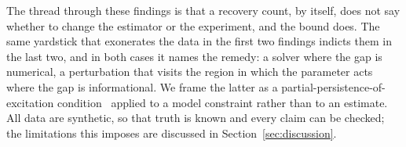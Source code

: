 The thread through these findings is that a recovery count, by itself, does not
say whether to change the estimator or the experiment, and the bound does. The
same yardstick that exonerates the data in the first two findings
indicts them in the last two, and in both cases it names the remedy: a solver
where the gap is numerical, a perturbation that visits the region in which the
parameter acts where the gap is informational. We frame the latter as a
partial-persistence-of-excitation
condition~\citep{wang2006learning,sastry1989adaptive} applied to a model
constraint rather than to an estimate. All data are synthetic, so that truth
is known and every claim can be checked; the limitations this imposes are
discussed in Section~\ref{sec:discussion}.

